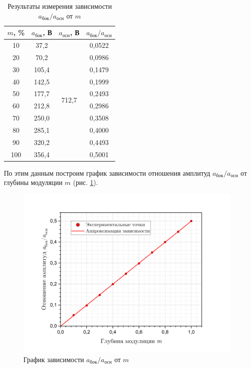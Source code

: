\documentclass[a4paper, 12pt]{article}
\begin{document}
    \begin{table}[H]
        \centering
        \begin{tabular}{|c|c|c|c|}
        \hline
        $m$, \% & $a_\text{бок}$, В & $a_\text{осн}$, В & $a_\text{бок}/a_\text{осн}$ \\ \hline
        10 & 37,2 & \multirow{10}{*}{712,7} & 0,0522 \\ \cline{1-2} \cline{4-4} 
        20 & 70,2 &  & 0,0986 \\ \cline{1-2} \cline{4-4} 
        30 & 105,4 &  & 0,1479 \\ \cline{1-2} \cline{4-4} 
        40 & 142,5 &  & 0,1999 \\ \cline{1-2} \cline{4-4} 
        50 & 177,7 &  & 0,2493 \\ \cline{1-2} \cline{4-4} 
        60 & 212,8 &  & 0,2986 \\ \cline{1-2} \cline{4-4} 
        70 & 250,0 &  & 0,3508 \\ \cline{1-2} \cline{4-4} 
        80 & 285,1 &  & 0,4000 \\ \cline{1-2} \cline{4-4} 
        90 & 320,2 &  & 0,4493 \\ \cline{1-2} \cline{4-4} 
        100 & 356,4 &  & 0,5001 \\ \hline
        \end{tabular}
        \caption{Результаты измерения зависимости $a_\text{бок}/a_\text{осн}$ от $m$}
        \label{modulation}
    \end{table}

    По этим данным построим график зависимости отношения амплитуд $a_\text{бок}/a_\text{осн}$ от глубины модуляции $m$ (рис. \ref{graph:modulation}).

    \begin{figure}[H]
        \centering
        \includegraphics[width = 14 cm]{images/graph_modulation.png}
        \caption{График зависимости $a_\text{бок}/a_\text{осн}$ от $m$}
        \label{graph:modulation}
    \end{figure}
\end{document}
